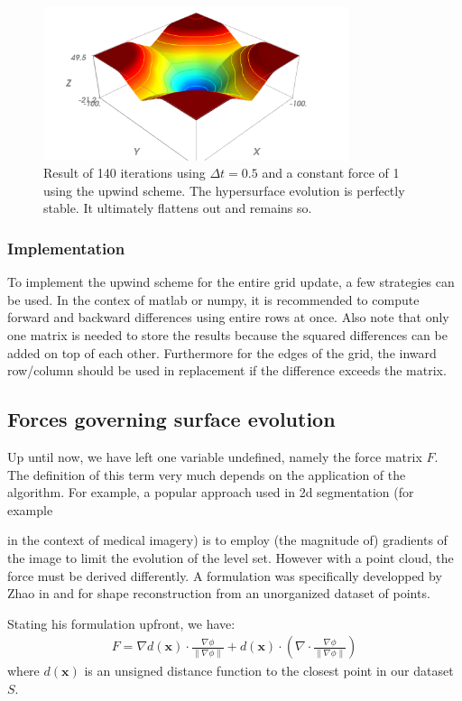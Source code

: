 \documentclass{article}
\begin{document}
\begin{figure}[H]
  \centering
  \includegraphics[width=0.8\textwidth]{img/up02.png}
  \caption{Result of 140 iterations using $ \Delta t = 0.5$ and a constant force
  of 1 using the upwind scheme. The hypersurface evolution is perfectly stable.
  It ultimately flattens out and remains so.}    
\end{figure}

\subsubsection{Implementation}
To implement the upwind scheme for the entire grid
update, a few strategies can be used. In the contex of matlab or numpy, it is
recommended to compute forward and backward differences using entire rows at
once. Also note that only one matrix is needed to store the results because the
squared differences can be added on top of each other.  Furthermore for the
edges of the grid, the inward row/column should be used in replacement if the
difference exceeds the matrix.

\subsection{Forces governing surface evolution}

Up until now, we have left one variable undefined, namely the force matrix $F$.
The definition of this term very much depends on the application of the
algorithm. For example, a popular approach used in 2d segmentation (for example

in the context of medical imagery) is to employ (the magnitude of)
gradients of the image to limit the evolution of the level set.
However with a point cloud, the force must be derived differently. A
formulation was specifically developped by Zhao in
\cite{zhao2000implicit} and \cite{zhao2001fast} for shape
reconstruction from an unorganized dataset of points. 

Stating his formulation upfront, we have:
\begin{align}
    \label{eq:force}
    F = \nabla d(\mathbf{x}) \cdot \frac{\nabla \phi}{\| \nabla \phi \|}
+ d(\mathbf{x}) \cdot (\nabla \cdot \frac{\nabla \phi}{\| \nabla \phi \|} )
\end{align}
where $d(\mathbf{x})$ is an unsigned distance function to the closest point in
our dataset $S$.
\end{document}
